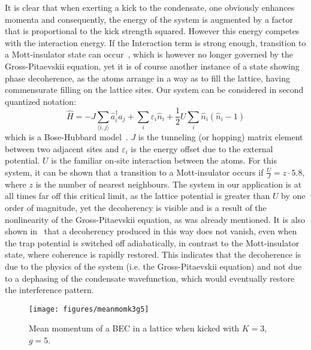 
It is clear that when exerting a kick to the condensate, one obviously enhances momenta and consequently, the energy of the system is augmented by a factor that is proportional
to the kick strength squared. However this energy competes with the interaction energy. If the Interaction term is strong enough, transition to a Mott-insulator state can occur~\cite{esslinger, jaksch}, which is however no longer governed by the Gross-Pitaevskii equation, yet it is of course another instance of a state showing phase decoherence, as the atoms arrange in a way as to fill the lattice, having commensurate filling on the lattice sites. 
Our system can be considered in second quantized notation:
\begin{equation}\label{eq:Bosehubbard}
\hat{H}=-J\sum_{\langle i, j\rangle}\hat{a} ^{\dagger}_i\hat{a}_j+\sum_i\varepsilon_i\hat{n}_i+\frac{1}{2}U\sum_i\hat{n}_i\left(\hat{n}_i-1\right)
\end{equation}
which is a Bose-Hubbard model~\cite{jaksch}. $J$ is the tunneling (or hopping) matrix element between two adjacent sites and $\varepsilon_i$ is the energy offset due to the external potential. $U$ is the familiar on-site interaction between the atoms. For this system, it can be shown that a transition to a Mott-insulator occurs if $\frac{U}{J}=z\cdot 5.8$, where $z$ is the number of nearest neighbours. The system in our application is at all times far off this critical limit, as the lattice potential is greater than $U$ by one order of magnitude, yet the decoherency is visible and is a result of the nonlinearity of the Gross-Pitaevskii equation, as was already mentioned. It is also shown in~\cite{esslinger} that a decoherency produced in this way does not vanish, even when the trap potential is switched off adiabatically, in contrast to the Mott-insulator state, where coherence is rapidly restored. This indicates that the decoherence is due to the physics of the system (i.e. the Gross-Pitaevskii equation) and not due to a dephasing of the condensate wavefunction, which would eventually restore the interference pattern. 

\begin{figure}[H]
\begin{center}
\texttt{[image: figures/meanmomk3g5]}
\caption{Mean momentum of a BEC in a lattice when kicked with $K=3$, $g=5$.}
\label{fig:meanmomk3g5}
\end{center}
\end{figure}

